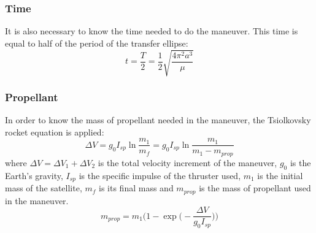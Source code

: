 \subsubsection{Time}
It is also necessary to know the time needed to do the maneuver. This time is equal to half of the period of the transfer ellipse:
\begin{equation}
t=\frac{T}{2}=\frac{1}{2}\sqrt{\frac{4\pi^{2}a^{3}}{\mu}}
\end{equation}

\subsubsection{Propellant}
In order to know the mass of propellant needed in the maneuver, the Tsiolkovsky rocket equation is applied:
\begin{equation}
\Delta V=g_{0}I_{sp}\ln{\frac{m_{1}}{m_{f}}}=g_{0}I_{sp}\ln{\frac{m_{1}}{m_{1}-m_{prop}}}
\end{equation}
where $\Delta V=\Delta V_{1}+\Delta V_{2}$ is the total velocity increment of the maneuver, $g_{0}$ is the Earth's gravity, $I_{sp}$ is the specific impulse of the thruster used, $m_{1}$ is the initial mass of the satellite, $m_{f}$ is its final mass and $m_{prop}$ is the mass of propellant used in the maneuver.
\begin{equation}
m_{prop}=m_{1}\Bigg(1-\exp\bigg(-\frac{\Delta V}{g_{0}I_{sp}}\bigg)\Bigg)
\end{equation}